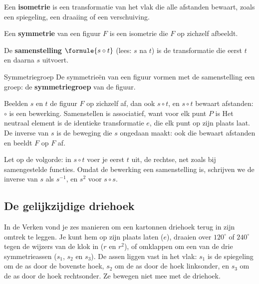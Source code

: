 \begin{theorie}
Een \textbf{\textcolor{accent}{isometrie}} is een transformatie van het vlak die alle afstanden bewaart, zoals een spiegeling, een draaiing of een verschuiving.

\vspace{1mm}
Een \textbf{\textcolor{accent}{symmetrie}} van een figuur $F$ is een isometrie die $F$ op zichzelf afbeeldt.

\vspace{1mm}
De \textbf{\textcolor{accent}{samenstelling}} $\formule{s \circ t}$ (lees: $s$ na $t$) is de transformatie die eerst $t$ en daarna $s$ uitvoert.

\begin{stelling}{Symmetriegroep}
De symmetrieën van een figuur vormen met de samenstelling een groep: de \textbf{\textcolor{accent}{symmetriegroep}} van de figuur.
\end{stelling}

\begin{bewijs}
Beelden $s$ en $t$ de figuur $F$ op zichzelf af, dan ook $s \circ t$, en $s \circ t$ bewaart afstanden: $\circ$ is een bewerking. Samenstellen is associatief, want voor elk punt $P$ is
Het neutraal element is de identieke transformatie $e$, die elk punt op zijn plaats laat. De inverse van $s$ is de beweging die $s$ ongedaan maakt: ook die bewaart afstanden en beeldt $F$ op $F$ af.
\end{bewijs}
\end{theorie}

Let op de volgorde: in $s \circ t$ voer je eerst $t$ uit, de rechtse, net zoals bij samengestelde functies. Omdat de bewerking een samenstelling is, schrijven we de inverse van $s$ als $s^{-1}$, en $s^2$ voor $s \circ s$.

\subsection{De gelijkzijdige driehoek}

In de Verken vond je zes manieren om een kartonnen driehoek terug in zijn omtrek te leggen. Je kunt hem op zijn plaats laten ($e$), draaien over $120^\circ$ of $240^\circ$ tegen de wijzers van de klok in ($r$ en $r^2$), of omklappen om een van de drie symmetrieassen ($s_1$, $s_2$ en $s_3$). De assen liggen vast in het vlak: $s_1$ is de spiegeling om de as door de bovenste hoek, $s_2$ om de as door de hoek linksonder, en $s_3$ om de as door de hoek rechtsonder. Ze bewegen niet mee met de driehoek.

